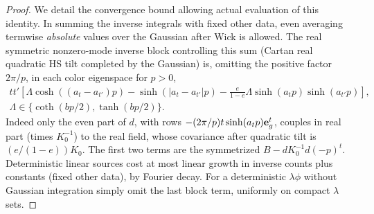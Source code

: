 \begin{proof}
We detail the convergence bound allowing actual evaluation of this identity. In summing the inverse integrals with fixed other data, even averaging termwise \emph{absolute} values over the Gaussian after Wick is allowed. The real symmetric nonzero-mode inverse block controlling this sum (Cartan real quadratic HS tilt completed by the Gaussian) is, omitting the positive factor \(2\pi/p\), in each color eigenspace for \(p>0\),
\[
 \begin{gathered}
 t t'\left[\Lambda\cosh((a_t-a_{t'})p)-\sinh(|a_t-a_{t'}|p)
 -\frac e{1-e}\Lambda\sinh(a_t p)\sinh(a_{t'}p)\right],\\
 \Lambda\in\{\coth(bp/2),\tanh(bp/2)\}.
 \end{gathered}
\]
Indeed only the even part of \(d\), with rows \(-(2\pi/p)t\sinh(a_t p){\bf e}_{g}^t\), couples in real part (times \(K_0^{-1}\)) to the real field, whose covariance after quadratic tilt is \((e/(1-e))K_0\). The first two terms are the symmetrized \(B-dK_0^{-1}d(-p)^t\). Deterministic linear sources cost at most linear growth in inverse counts plus constants (fixed other data), by Fourier decay. For a deterministic \(\lambda\phi\) without Gaussian integration simply omit the last block term, uniformly on compact \(\lambda\) sets.


\end{proof}
